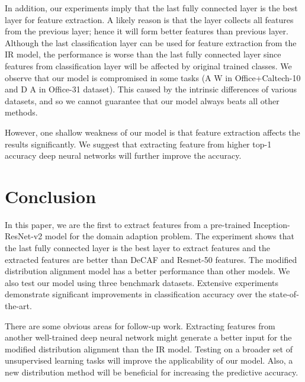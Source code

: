 \documentclass[10pt, conference, compsocconf]{IEEEtran}
\begin{document}
In addition, our experiments imply that the last fully connected layer is the best layer for feature extraction. A likely reason is that the layer collects all features from the previous layer; hence it will form better features than previous layer. Although the last classification layer can be used for feature extraction from the IR model, the performance is worse than the last fully connected layer since features from classification layer will be affected by original trained classes. We observe that our model is compromised in some tasks (A  W in Office+Caltech-10 and D  A in Office-31 dataset). This caused by the intrinsic differences of  various datasets, and so we cannot guarantee that our model always beats all other methods.

However, one shallow weakness of our model is that feature extraction affects the results significantly. We suggest that extracting feature from higher top-1 accuracy deep neural networks will further improve the accuracy.

\section{Conclusion}
In this paper, we are the first to extract features from a pre-trained Inception-ResNet-v2 model for the domain adaption problem.  The experiment shows that the last fully connected layer is the best layer to extract features and the extracted features are better than DeCAF and Resnet-50 features.  The modified distribution alignment model has a better performance than other models. We also test our model using three benchmark datasets.   Extensive experiments demonstrate significant improvements in classification accuracy over the state-of-the-art. 

There are some obvious areas for follow-up work. Extracting features from another well-trained deep neural network might generate a better input for the modified distribution alignment than the IR model.  Testing on a broader set of unsupervised learning tasks will improve the applicability of our model. Also, a new distribution method will be beneficial for increasing the predictive accuracy.




\footnotesize


\end{document}
